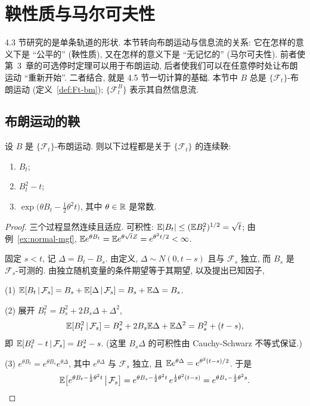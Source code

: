 \section{鞅性质与马尔可夫性}
\label{sec:4-4}

4.3 节研究的是单条轨道的形状. 本节转向布朗运动与信息流的关系: 它在怎样的意义下是 ``公平的'' (鞅性质), 又在怎样的意义下是 ``无记忆的'' (马尔可夫性). 前者使第~3~章的可选停时定理可以用于布朗运动, 后者使我们可以在任意停时处让布朗运动 ``重新开始''. 二者结合, 就是 4.5 节一切计算的基础. 本节中 $B$ 总是 $\{\mathcal{F}_t\}$-布朗运动 (定义~\ref{def:Ft-bm}); $\{\mathcal{F}^B_t\}$ 表示其自然信息流.

\subsection{布朗运动的鞅}

\begin{theorem}[布朗运动的三个基本鞅]\label{thm:bm-martingales}
设 $B$ 是 $\{\mathcal{F}_t\}$-布朗运动. 则以下过程都是关于 $\{\mathcal{F}_t\}$ 的连续鞅:
\begin{enumerate}
\item $B_t$;
\item $B_t^2-t$;
\item $\exp\big(\theta B_t-\frac{1}{2}\theta^2t\big)$, 其中 $\theta\in\mathbb{R}$ 是常数.
\end{enumerate}
\end{theorem}

\begin{proof}
三个过程显然连续且适应. 可积性: $\mathbb{E}\lvert B_t\rvert\le(\mathbb{E} B_t^2)^{1/2}=\sqrt{t}$; 由例~\ref{ex:normal-mgf}, $\mathbb{E} e^{\theta B_t}=\mathbb{E} e^{\theta\sqrt{t}Z}=e^{\theta^2t/2}<\infty$.

固定 $s<t$, 记 $\Delta=B_t-B_s$. 由定义, $\Delta\sim N(0,t-s)$ 且与 $\mathcal{F}_s$ 独立, 而 $B_s$ 是 $\mathcal{F}_s$-可测的. 由独立随机变量的条件期望等于其期望, 以及提出已知因子,

(1) $\mathbb{E}[B_t\,|\,\mathcal{F}_s]=B_s+\mathbb{E}[\Delta\,|\,\mathcal{F}_s]=B_s+\mathbb{E}\Delta=B_s$.

(2) 展开 $B_t^2=B_s^2+2B_s\Delta+\Delta^2$,
\[
\mathbb{E}[B_t^2\,|\,\mathcal{F}_s]=B_s^2+2B_s\mathbb{E}\Delta+\mathbb{E}\Delta^2=B_s^2+(t-s),
\]
即 $\mathbb{E}[B_t^2-t\,|\,\mathcal{F}_s]=B_s^2-s$. (这里 $B_s\Delta$ 的可积性由 Cauchy-Schwarz 不等式保证.)

(3) $e^{\theta B_t}=e^{\theta B_s}e^{\theta\Delta}$, 其中 $e^{\theta\Delta}$ 与 $\mathcal{F}_s$ 独立, 且 $\mathbb{E} e^{\theta\Delta}=e^{\theta^2(t-s)/2}$. 于是
\[
\mathbb{E}\big[e^{\theta B_t-\frac{1}{2}\theta^2t}\,\big|\,\mathcal{F}_s\big]=e^{\theta B_s-\frac{1}{2}\theta^2t}\,e^{\frac{1}{2}\theta^2(t-s)}=e^{\theta B_s-\frac{1}{2}\theta^2s}.\qedhere
\]
\end{proof}

